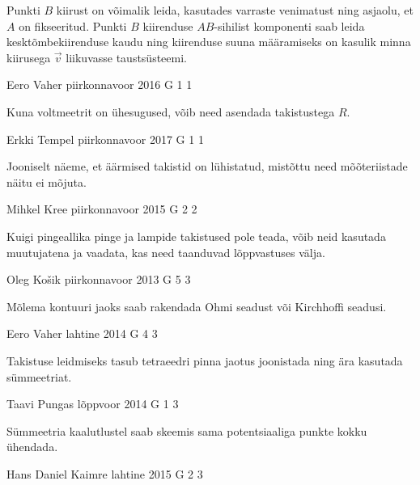 \documentclass[11pt, twoside]{article}
\begin{document}
{{\ifHint
Punkti $B$ kiirust on võimalik leida, kasutades varraste venimatust ning asjaolu, et $A$ on fikseeritud. Punkti $B$ kiirenduse $AB$-sihilist komponenti saab leida kesktõmbekiirenduse kaudu ning kiirenduse suuna määramiseks on kasulik minna kiirusega $\vec{v}$ liikuvasse taustsüsteemi.
\fi
}

{Eero Vaher} %
{piirkonnavoor} %
{2016} %
{G 1} %
{1} %
{

\ifHint
Kuna voltmeetrit on ühesugused, võib need asendada takistustega $R$.
\fi
}

{Erkki Tempel} %
{piirkonnavoor} %
{2017} %
{G 1} %
{1} %
{

\ifHint
Jooniselt näeme, et äärmised takistid on lühistatud, mistõttu need mõõteriistade näitu ei mõjuta.
\fi
}

{Mihkel Kree} %
{piirkonnavoor} %
{2015} %
{G 2} %
{2} %
{

\ifHint
Kuigi pingeallika pinge ja lampide takistused pole teada, võib neid kasutada muutujatena ja vaadata, kas need taanduvad lõppvastuses välja.
\fi
}

{Oleg Košik} %
{piirkonnavoor} %
{2013} %
{G 5} %
{3} %
{

\ifHint
Mõlema kontuuri jaoks saab rakendada Ohmi seadust või Kirchhoffi seadusi.
\fi
}

{Eero Vaher} %
{lahtine} %
{2014} %
{G 4} %
{3} %
{

\ifHint
Takistuse leidmiseks tasub tetraeedri pinna jaotus joonistada ning ära kasutada sümmeetriat.
\fi
}

{Taavi Pungas} %
{lõppvoor} %
{2014} %
{G 1} %
{3} %
{

\ifHint
Sümmeetria kaalutlustel saab skeemis sama potentsiaaliga punkte kokku ühendada.
\fi
}

{Hans Daniel Kaimre} %
{lahtine} %
{2015} %
{G 2} %
{3} %
{

}}
\end{document}
